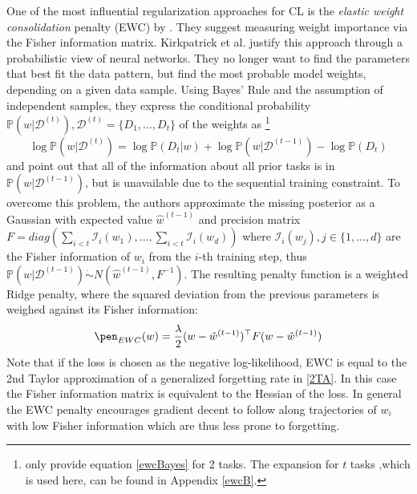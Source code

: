 One of the most influential regularization approaches for CL is the \textit{elastic weight consolidation} penalty (EWC) by \citeauthor{JK} \cite{zhao2024statisticaltheoryregularizationbasedcontinual, zenke2017continuallearningsynapticintelligence, Husz_r_2018, li2024fixeddesignanalysisregularizationbased, titsias2020functionalregularisationcontinuallearning, yin2021optimizationgeneralizationregularizationbasedcontinual, loo2020generalizedvariationalcontinuallearning, benzing2021unifyingregularisationmethodscontinual}. They suggest measuring weight importance via the Fisher information matrix. Kirkpatrick et al. justify this approach through a probabilistic view of neural networks. They no longer want to find the parameters that best fit the data pattern, but find the most probable model weights, depending on a given data sample. Using Bayes' Rule and the assumption of independent samples, they express the conditional probability $\mathbb{P}(w|\mathcal{D}^{(t)}), \mathcal{D}^{(t)} = \{D_1, ..., D_t\}$ of the weights as \footnote{\citeauthor{JK} \cite{JK} only provide equation \eqref{ewcBayes} for 2 tasks. The expansion for $t$ tasks ,which is used here, can be found in Appendix \ref{ewcB}.}
\begin{equation}\label{ewcBayes}
	\log\mathbb{P}(w|\mathcal{D}^{(t)}) = \log\mathbb{P}(D_{t}|w) + \log\mathbb{P}(w|\mathcal{D}^{(t-1)}) - \log\mathbb{P}(D_t)
\end{equation}
and point out that all of the information about all prior tasks is in $\mathbb{P}(w|\mathcal{D}^{(t-1)})$, but is unavailable due to the sequential training constraint. To overcome this problem, the authors approximate the missing posterior as a Gaussian with expected value $\hat{w}^{(t-1)}$ and precision matrix $F = diag(\sum_{i < t}\mathcal{I}_i(w_1), ..., \sum_{i < t }\mathcal{I}_i(w_d))$ where $\mathcal{I}_i(w_j), j \in \{1, ..., d\}$ are the Fisher information of $w_i$ from the $i$-th training step, thus $\mathbb{P}(w|\mathcal{D}^{(t-1)}) \dot{\sim} N(\hat{w}^{(t-1)}, F^{-1})$. The resulting penalty function is a weighted Ridge penalty, where the squared deviation from the previous parameters is weighed against its Fisher information:
\begin{equation}\label{EWC}
	\pen_{EWC}(w) = \frac{\lambda}{2}(w - \hat{w}^{(t-1)})^\top F (w - \hat{w}^{(t-1)})
\end{equation}
Note that if the loss is chosen as the negative log-likelihood, EWC is equal to the 2nd Taylor approximation of a generalized forgetting rate in \eqref{2TA}. In this case the Fisher information matrix is equivalent to the Hessian of the loss. In general the EWC penalty encourages gradient decent to follow along trajectories of $w_i$ with low Fisher information which are thus less prone to forgetting.

